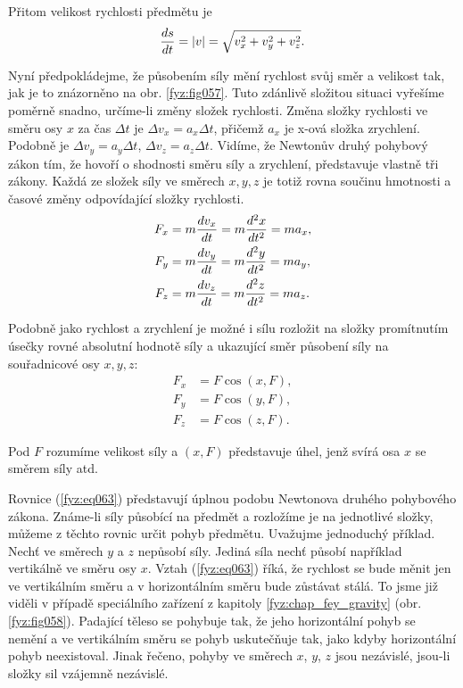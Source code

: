     Přitom velikost rychlosti předmětu je
    \begin{equation}\label{fyz:eq062}
      \dfrac{d s}{d t} = \lvert v\rvert = \sqrt{v^2_x + v^2_y + v^2_z}. 
    \end{equation}
    
    Nyní předpokládejme, že působením síly mění rychlost svůj směr a velikost tak, jak je to 
    znázorněno na obr. \ref{fyz:fig057}. Tuto zdánlivě složitou situaci vyřešíme poměrně snadno, 
    určíme-li změny složek rychlosti. Změna složky rychlosti ve směru osy \(x\) za čas \(\Delta t\) 
    je \(\Delta v_x = a_x\Delta t\), přičemž \(a_x\) je x-ová složka zrychlení. Podobně je \(\Delta 
    v_y = a_y\Delta t\), \(\Delta v_z = a_z\Delta t\). Vidíme, že Newtonův druhý pohybový 
    zákon tím, že hovoří o shodnosti směru síly a zrychlení, představuje vlastně tři zákony. Každá 
    ze složek síly ve směrech \(x, y, z\) je totiž rovna součinu hmotnosti a časové změny 
    odpovídající složky rychlosti.
    \begin{subequations}\label{fyz:eq063}
      \begin{align}
        F_x &= m\dfrac{d v_x}{d t} = m\dfrac{d^2 x}{d t^2} = ma_x, \\
        F_y &= m\dfrac{d v_y}{d t} = m\dfrac{d^2 y}{d t^2} = ma_y, \\
        F_z &= m\dfrac{d v_z}{d t} = m\dfrac{d^2 z}{d t^2} = ma_z. 
      \end{align}
    \end{subequations}
    
    Podobně jako rychlost a zrychlení je možné i sílu rozložit na složky promítnutím úsečky rovné 
    absolutní hodnotě síly a ukazující směr působení síly na souřadnicové osy \(x, y, z\):
    \begin{subequations}\label{fyz:eq064}
      \begin{align}
        F_x &= F\cos(x,F),\\
        F_y &= F\cos(y,F),\\
        F_z &= F\cos(z,F).
      \end{align}
    \end{subequations}

    Pod \(F\) rozumíme velikost síly a \((x, F)\) představuje úhel, jenž svírá osa \(x\) se směrem 
    síly atd.
    
    Rovnice (\ref{fyz:eq063}) představují úplnou podobu Newtonova druhého pohybového zákona. 
    Známe-li síly působící na předmět a rozložíme je na jednotlivé složky, můžeme z těchto rovnic 
    určit pohyb předmětu. Uvažujme jednoduchý příklad. Nechť ve směrech \(y\) a \(z\) nepůsobí 
    síly. Jediná síla nechť působí například vertikálně ve směru osy \(x\). Vztah (\ref{fyz:eq063}) 
    říká, že rychlost se bude měnit jen ve vertikálním směru a v horizontálním směru bude zůstávat 
    stálá. To jsme již viděli v případě speciálního zařízení z kapitoly \ref{fyz:chap_fey_gravity} 
    (obr. \ref{fyz:fig058}). Padající těleso se pohybuje tak, že jeho horizontální pohyb se nemění 
    a ve vertikálním směru se pohyb uskutečňuje tak, jako kdyby horizontální pohyb neexistoval. 
    Jinak řečeno, pohyby ve směrech \(x\), \(y\), \(z\) jsou nezávislé, jsou-li složky sil vzájemně 
    nezávislé.
    
